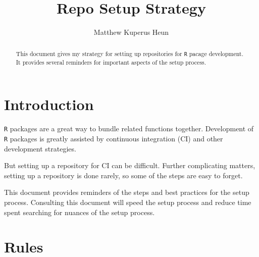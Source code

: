 \documentclass{article}
\begin{document}
\title{Repo Setup Strategy}
\author{Matthew Kuperus Heun}

\maketitle


\begin{abstract}

This document gives my strategy for setting up repositories for 
\texttt{R} pacage development. 
It provides several reminders for important aspects of the setup process.
\end{abstract}


\section{Introduction} 
\label{sec:introduction}

\texttt{R} packages are a great way to bundle related functions together.
Development of \texttt{R} packages is greatly assisted by 
continuous integration (CI) and other development strategies.

But setting up a repository for CI can be difficult.
Further complicating matters, setting up a repository is done rarely, 
so some of the steps are easy to forget.

This document provides reminders of the steps 
and best practices for the setup process.
Consulting this document will speed the setup process
and reduce time spent searching for nuances of the setup process.


\section{Rules} 
\label{sec:rules}
\end{document}
